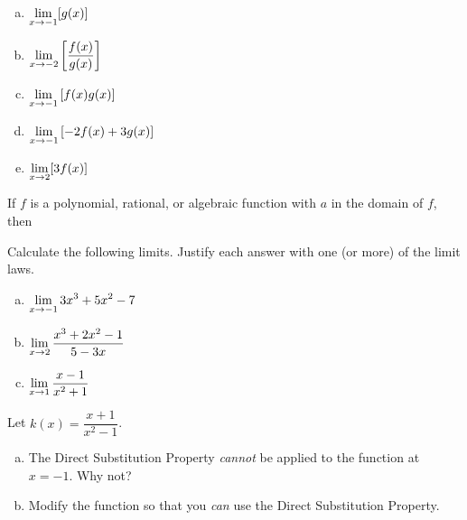 \documentclass[notes]{subfiles}
\begin{document}
\begin{ex}
\begin{minipage}{.58\textwidth}
\begin{flushleft}
\begin{multicols*}{2}
\begin{enumerate}[(a)]
								\vspace{1in}
							\item $\displaystyle \lim_{x\to -1} [g(x)]$
								\vspace{1in}
							\item $\displaystyle \lim_{x\to -2}\left[\dfrac{f(x)}{g(x)}\right]$
								\vspace{1in}
								\columnbreak 
							\item $\displaystyle \lim_{x\to -1}\left[f(x)g(x)\right]$
								\vspace{1in}
							\item $\displaystyle \lim_{x\to -1}\left[-2f(x)+3g(x)\right]$
								\vspace{1.1in}
							\item $\displaystyle \lim_{x\to 2} [3f(x)]$	
								\vspace{1in}
						\end{enumerate}
							\raggedcolumns
					\end{multicols*}
				\end{flushleft}
			\end{minipage}
		\end{ex}
		
		\begin{rmk}
			If $f$ is a polynomial, rational, or algebraic function with $a$ in the domain of $f$, then 
		\end{rmk}	
			\newpage
			
		\begin{ex}
			Calculate the following limits.  Justify each answer with one (or more) of the limit laws.
			\begin{enumerate}[(a)]
				\item $\displaystyle \lim_{x\to -1} 3x^3+5x^2-7$
					
				\item $\displaystyle \lim_{x\to 2} \dfrac{x^3+2x^2-1}{5-3x}$
					
				\item $\displaystyle \lim_{x\to 1} \dfrac{x-1}{x^2+1}$
					
			\end{enumerate}
		\end{ex}
			\newpage
			
		\begin{question}
			Let $k(x) = \dfrac{x+1}{x^2-1}$.
			\begin{enumerate}[(a)]
				\item The Direct Substitution Property \emph{cannot} be applied to the function at $x = -1$.  Why not?
					
				\item Modify the function so that you \emph{can} use the Direct Substitution Property.
			\end{enumerate}
		\end{question} 
		\newsec
		
\end{document}
